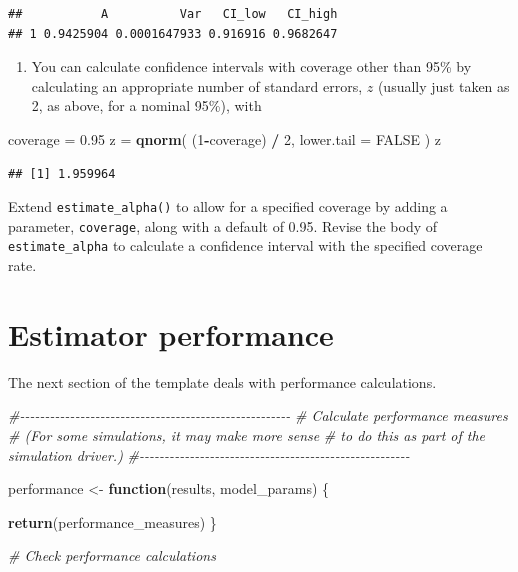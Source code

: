 \documentclass[
]{book}
\newenvironment{Shaded}{\begin{snugshade}}{\end{snugshade}}
\newcommand{\AttributeTok}[1]{\textcolor[rgb]{0.13,0.29,0.53}{#1}}
\newcommand{\CommentTok}[1]{\textcolor[rgb]{0.56,0.35,0.01}{\textit{#1}}}
\newcommand{\ConstantTok}[1]{\textcolor[rgb]{0.56,0.35,0.01}{#1}}
\newcommand{\ControlFlowTok}[1]{\textcolor[rgb]{0.13,0.29,0.53}{\textbf{#1}}}
\newcommand{\DecValTok}[1]{\textcolor[rgb]{0.00,0.00,0.81}{#1}}
\newcommand{\FloatTok}[1]{\textcolor[rgb]{0.00,0.00,0.81}{#1}}
\newcommand{\FunctionTok}[1]{\textcolor[rgb]{0.13,0.29,0.53}{\textbf{#1}}}
\newcommand{\NormalTok}[1]{#1}
\newcommand{\OtherTok}[1]{\textcolor[rgb]{0.56,0.35,0.01}{#1}}
\newcommand{\SpecialCharTok}[1]{\textcolor[rgb]{0.81,0.36,0.00}{\textbf{#1}}}
\providecommand{\tightlist}{%
  \setlength{\itemsep}{0pt}\setlength{\parskip}{0pt}}
\begin{document}
\begin{verbatim}
##           A          Var   CI_low   CI_high
## 1 0.9425904 0.0001647933 0.916916 0.9682647
\end{verbatim}

\begin{enumerate}
\def\labelenumi{\arabic{enumi}.}
\setcounter{enumi}{1}
\tightlist
\item
  You can calculate confidence intervals with coverage other than 95\% by calculating an appropriate number of standard errors, \(z\) (usually just taken as 2, as above, for a nominal 95\%), with
\end{enumerate}

\begin{Shaded}
\begin{Highlighting}[]
\NormalTok{coverage }\OtherTok{=} \FloatTok{0.95}
\NormalTok{z }\OtherTok{=} \FunctionTok{qnorm}\NormalTok{( (}\DecValTok{1}\SpecialCharTok{{-}}\NormalTok{coverage) }\SpecialCharTok{/} \DecValTok{2}\NormalTok{, }\AttributeTok{lower.tail =} \ConstantTok{FALSE}\NormalTok{ )}
\NormalTok{z}
\end{Highlighting}
\end{Shaded}

\begin{verbatim}
## [1] 1.959964
\end{verbatim}

Extend \texttt{estimate\_alpha()} to allow for a specified coverage by adding a parameter, \texttt{coverage}, along with a default of 0.95. Revise the body of \texttt{estimate\_alpha} to calculate a confidence interval with the specified coverage rate.

\section{Estimator performance}\label{estimator-performance}

The next section of the template deals with performance calculations.

\begin{Shaded}
\begin{Highlighting}[]
\CommentTok{\#{-}{-}{-}{-}{-}{-}{-}{-}{-}{-}{-}{-}{-}{-}{-}{-}{-}{-}{-}{-}{-}{-}{-}{-}{-}{-}{-}{-}{-}{-}{-}{-}{-}{-}{-}{-}{-}{-}{-}{-}{-}{-}{-}{-}{-}{-}{-}{-}{-}{-}{-}{-}{-}{-}}
\CommentTok{\# Calculate performance measures}
\CommentTok{\# (For some simulations, it may make more sense}
\CommentTok{\# to do this as part of the simulation driver.)}
\CommentTok{\#{-}{-}{-}{-}{-}{-}{-}{-}{-}{-}{-}{-}{-}{-}{-}{-}{-}{-}{-}{-}{-}{-}{-}{-}{-}{-}{-}{-}{-}{-}{-}{-}{-}{-}{-}{-}{-}{-}{-}{-}{-}{-}{-}{-}{-}{-}{-}{-}{-}{-}{-}{-}{-}{-}}

\NormalTok{performance }\OtherTok{\textless{}{-}} \ControlFlowTok{function}\NormalTok{(results, model\_params) \{}

  \FunctionTok{return}\NormalTok{(performance\_measures)}
\NormalTok{\}}

\CommentTok{\# Check performance calculations}
\end{Highlighting}
\end{Shaded}
\end{document}
